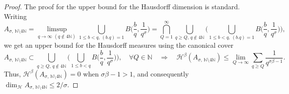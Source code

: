 \documentclass[11pt,reqno]{amsart}
\theoremstyle{definition}
\begin{document}
\begin{proof}
The proof for the upper bound for the Hausdorff dimension is standard. 
Writing 
\begin{equation}
A_{\sigma,  \, \mathbb N \setminus 4\mathbb N}
= \limsup_{   q \to \infty \, \, (q \not\in 4\mathbb N) } \bigcup_{ 1 \leq b < q, \, (b.q)=1 } B\Big( \frac{b}{q}, \frac{1}{q^\sigma} \Big) 
= \bigcap_{Q = 1}^\infty  \bigcup_{ q \geq Q, \,  q \not\in 4\mathbb N }  \Bigg(   \bigcup_{ 1 \leq b < q, \, (b.q)=1  } B\Big( \frac{b}{q}, \frac{1}{q^\sigma} \Big)  \Bigg), 
\end{equation} 
we get an upper bound for the Hausdorff measures using the canonical cover
\begin{equation}\label{eq:Canonical_Cover_Irrationals}
A_{\sigma,  \, \mathbb N \setminus 4\mathbb N}
 \subset \bigcup_{ q \geq Q, \, q \not\in 4\mathbb N }  \Big(   \bigcup_{ 1 \leq b < q } B\Big( \frac{b}{q}, \frac{1}{q^\sigma} \Big)  \Big), \quad \forall Q \in \mathbb N
\quad \Longrightarrow \quad 
\mathcal H ^\beta(A_{\sigma,  \, \mathbb N \setminus 4\mathbb N}) \leq \lim_{Q \to \infty} \sum_{ q \geq  Q } \frac{1}{q^{\sigma\beta - 1}}. 
\end{equation}
Thus, $\mathcal H^\beta(A_{\sigma,  \, \mathbb N \setminus 4\mathbb N}) = 0$ when $ \sigma\beta - 1 > 1$, and consequently 
$\operatorname{dim}_{\mathcal H} A_{\sigma,  \, \mathbb N \setminus 4\mathbb N} \leq 2/\sigma$. 


\end{proof}
\end{document}
